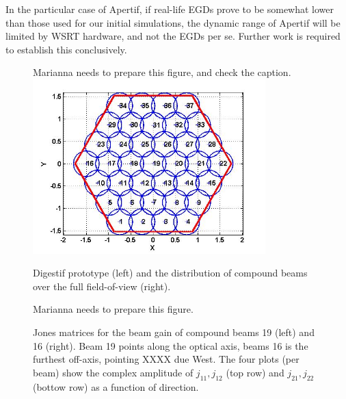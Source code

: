 \documentclass{aps2010} \special{papersize=8.5in,11in}
\begin{document}
In the particular case of Apertif, if real-life EGDs prove to be somewhat lower than those used for our initial simulations, the dynamic range of Apertif will be limited by WSRT hardware, and not the EGDs per se. Further work is required to establish this conclusively.

\begin{figure}
Marianna needs to prepare this figure, and check the caption.
\includegraphics[width=9cm]{ArrangementOfBeams} 
\caption{\label{fig:apertif}Digestif prototype (left) and the distribution of compound beams over the full field-of-view (right).}
\end{figure}


\begin{figure}
Marianna needs to prepare this figure. 
\caption{\label{fig:jones-matrix}Jones matrices for the beam gain of compound beams 19 (left) and 16 (right).
Beam 19 points along the optical axis, beams 16 is the furthest off-axis, pointing XXXX due West. The four plots (per beam) 
show the complex amplitude of $j_{11},j_{12}$ (top row) and $j_{21},j_{22}$ (bottow row) as a function of direction.
}
\end{figure}
\end{document}
